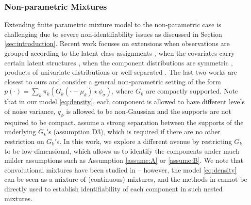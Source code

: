 \documentclass[bj,authoryear]{imsart}
\theoremstyle{plain}
\theoremstyle{remark}
\begin{document}
\subsubsection*{Non-parametric Mixtures}
Extending finite parametric mixture model to the non-parametric case is challenging due to severe non-identifiability issues as discussed in Section \ref{sec:introduction}. Recent work focuses on extensions when observations are grouped according to the latent class assignments \cite{vandermeulen2019operator, ritchie2020consistent}, when the covariates carry certain latent structures \cite{allman2009identifiability, gassiat2016nonparametric}, when the component distributions are symmetric \cite{bordes2006semiparametric, hunter2007inference}, products of
univariate distributions \cite{hall2003nonparametric, elmore2005application} or well-separated \cite{aragam2020identifiability, aragam2023uniform}. The last two works are closest to ours and consider a general non-parametric setting of the form $p(\cdot) = \sum_k \pi_k \left(G_k(\cdot-\mu_k) \star \phi_{\sigma} \right)$, where $G_k$ are compactly supported. Note that in our model \eqref{eq:density}, each component is allowed to have different levels of noise variance, $q_{\phi}$ is allowed to be non-Gaussian and the supports are not required to be compact. \cite{aragam2023uniform} assume a strong separation between the supports of the underlying $G_k'$s (assumption D3), which is required if there are no other restriction on $G_k'$s. In this work, we explore a different avenue by restricting $G_k$ to be low-dimensional, which allows us to identify the components under much milder assumptions such as Assumption \ref{assume:A} or \ref{assume:B}. 
We note that convolutional mixtures have been studied in \cite{nguyen2013convergence} -- however, the model \eqref{eq:density} can be seen as a mixture of (continuous) mixtures, and the methods in \cite{nguyen2013convergence} cannot be directly used to establish identifiability of each component in such nested mixtures.
\end{document}
